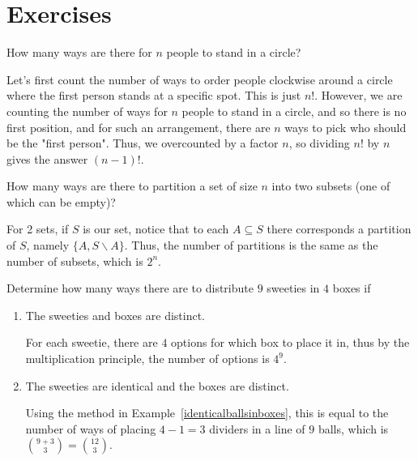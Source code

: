 \documentclass[11pt,dvipsnames]{book}
\numberwithin{equation}{section} %
\numberwithin{figure}{section} %
\numberwithin{table}{section} %
\begin{document}
\section{Exercises}
\begin{exercise}
 How many ways are there for $n$ people to stand in a circle?
 
 \begin{solution}
 Let's first count the number of ways to order people clockwise around a circle where the first person stands at a specific spot. This is just $n!$. However, we are counting the number of ways for $n$ people to stand in a circle, and so there is no first position, and for such an arrangement, there are $n$ ways to pick who should be the "first person". Thus, we overcounted by a factor $n$, so dividing $n!$ by $n$ gives the answer $(n-1)!$.
 \end{solution}
 \end{exercise}
 
 
\begin{exercise}
How many ways are there to partition a set of size $n$ into two subsets (one of which can be empty)? 
\begin{solution}
For 2 sets, if $S$ is our set, notice that to each $A\subseteq S$ there corresponds a partition of $S$, namely $\{A,S\backslash A\}$. Thus, the number of partitions is the same as the number of subsets, which is $2^{n}$. 
\end{solution}
\end{exercise}



\begin{exercise}
Determine how many ways there are to distribute $9$ sweeties in $4$ boxes if
\begin{enumerate}[label=(\alph*)]
\item The sweeties and boxes are distinct.
\begin{solution}
For each sweetie, there are $4$ options for which box to place it in, thus by the multiplication principle, the number of options is $4^{9}$.
\end{solution}
\item The sweeties are identical and the boxes are distinct.
\begin{solution}
Using the method in Example~\ref{identicalballsinboxes}, this is equal to the number of ways of placing $4-1 = 3$ dividers in a line of $9$ balls, which is ${{9+3}\choose {3}} = {12 \choose 3}$. 
\end{solution}
\end{enumerate}
\end{exercise}
\end{document}
